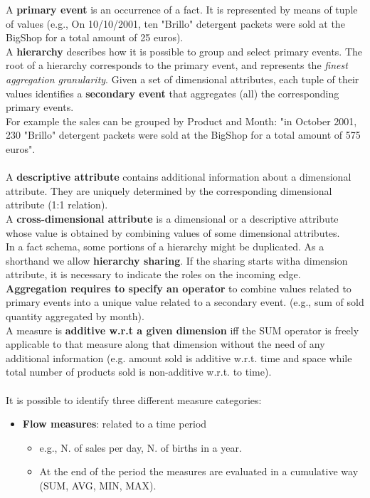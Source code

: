 \documentclass[10pt,a4paper]{article}
\newcommand{\nline}{\\~\\}
\begin{document}
\begin{justify}
A \textbf{primary event} is an occurrence of a fact. It is represented by means of tuple of values (e.g., On 10/10/2001, ten "Brillo" detergent packets were sold at the BigShop for a total amount of 25 euros). \\
A \textbf{hierarchy} describes how it is possible to group and select primary events. The root of a hierarchy corresponds to the primary event, and represents the \textit{finest aggregation granularity}.
Given a set of dimensional attributes, each tuple of their values identifies a \textbf{secondary event} that aggregates (all) the corresponding primary events. \\ For example the sales can be grouped by Product and Month: "in October 2001, 230 "Brillo" detergent packets were sold at the BigShop for a total amount of 575 euros". \nline
A \textbf{descriptive attribute} contains additional information about a dimensional attribute. They are uniquely determined by the corresponding dimensional attribute (1:1 relation). \\
A \textbf{cross-dimensional attribute} is a dimensional or a descriptive attribute whose value is obtained by combining values of some dimensional attributes. \\
In a fact schema, some portions of a hierarchy might be duplicated. As a shorthand we allow \textbf{hierarchy sharing}. If the sharing starts witha dimension attribute, it is necessary to indicate the roles on the incoming edge. \\
\textbf{Aggregation requires to specify an operator} to combine values related to primary events into a unique value related to a secondary event. (e.g., sum of sold quantity aggregated by month). \\
A measure is \textbf{additive w.r.t a given dimension} iff the SUM operator is freely applicable to that measure along that dimension without the need of any additional information (e.g. amount sold is additive w.r.t. time and space while total number of products sold is non-additive w.r.t. to time). \nline
It is possible to identify three different measure categories:
\begin{itemize}
	\item \textbf{Flow measures}: related to a time period 
	\begin{itemize}
		\item e.g., N. of sales per day, N. of births in a year.
		\item  At the end of the period the measures are evaluated in a cumulative way (SUM, AVG, MIN, MAX).
	\end{itemize}

\end{itemize}
\end{justify}
\end{document}
